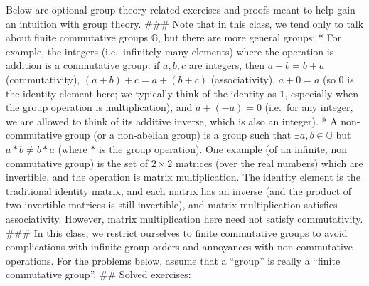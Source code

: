 Below are optional group theory related exercises and proofs meant to
help gain an intuition with group theory. \#\#\# Note that in this
class, we tend only to talk about finite commutative groups
\(\mathbb{G}\), but there are more general groups: * For example, the
integers (i.e.~infinitely many elements) where the operation is addition
is a commutative group: if \(a,b,c\) are integers, then \(a+b = b+a\)
(commutativity), \((a+b)+c = a+(b+c)\) (associativity), \(a+0 = a\) (so
\(0\) is the identity element here; we typically think of the identity
as \(1\), especially when the group operation is multiplication), and
\(a+(-a) = 0\) (i.e.~for any integer, we are allowed to think of its
additive inverse, which is also an integer). * A non-commutative group
(or a non-abelian group) is a group such that
\(\exists a,b \in \mathbb{G}\) but \(a * b \neq b * a\) (where \(*\) is
the group operation). One example (of an infinite, non commutative
group) is the set of \(2 \times 2\) matrices (over the real numbers)
which are invertible, and the operation is matrix multiplication. The
identity element is the traditional identity matrix, and each matrix has
an inverse (and the product of two invertible matrices is still
invertible), and matrix multiplication satisfies associativity. However,
matrix multiplication here need not satisfy commutativity. \#\#\# In
this class, we restrict ourselves to finite commutative groups to avoid
complications with infinite group orders and annoyances with
non-commutative operations. For the problems below, assume that a
``group'' is really a ``finite commutative group''. \#\# Solved
exercises:

